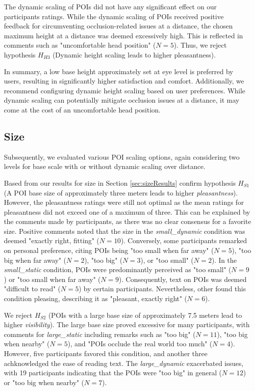 The dynamic scaling of POIs did not have any significant effect on our participants ratings. While the dynamic scaling of POIs received positive feedback for circumventing occlusion-related issues at a distance, the chosen maximum height at a distance was deemed excessively high. This is reflected in comments such as "uncomfortable head position" ($N=5$). Thus, we reject hypothesis $H_{H3}$ (Dynamic height scaling leads to higher pleasantness).

In summary, a low base height approximately set at eye level is preferred by users, resulting in significantly higher satisfaction and comfort. Additionally, we recommend configuring dynamic height scaling based on user preferences. While dynamic scaling can potentially mitigate occlusion issues at a distance, it may come at the cost of an uncomfortable head position.


\subsection{Size}
Subsequently, we evaluated various POI scaling options, again considering two levels for base scale with or without dynamic scaling over distance. 

Based from our results for size in Section \ref{sec:sizeResults} confirm hypothesis $H_{S1}$ (A POI base size of approximately three meters leads to higher \textit{pleasantness}). However, the pleasantness ratings were still not optimal as the mean ratings for pleasantness did not exceed one of a maximum of three. This can be explained by the comments made by participants, as there was no clear consensus for a favorite size. Positive comments noted that the size in the \textit{small\_dynamic} condition was deemed "exactly right, fitting" ($N=10$). Conversely, some participants remarked on personal preference, citing POIs being "too small when far away" ($N=5$), "too big when far away" ($N=2$), "too big" ($N=3$), or "too small" ($N=2$). In the \textit{small\_static} condition, POIs were predominantly perceived as "too small" ($N=9$) or "too small when far away" ($N=9$). Consequently, text on POIs was deemed "difficult to read" ($N=5$) by certain participants. Nevertheless, other found this condition pleasing, describing it as "pleasant, exactly right" ($N=6$).

We reject $H_{S2}$ (POIs with a large base size of approximately 7.5 meters lead to higher \textit{visibility}). The large base size proved excessive for many participants, with comments for \textit{large\_static} including remarks such as "too big" ($N=11$), "too big when nearby" ($N=5$), and "POIs occlude the real world too much" ($N=4$). However, five participants favored this condition, and another three achknowledged the ease of reading text.
The \textit{large\_dynamic} exacerbated issues, with 19 participants indicating that the POIs were "too big" in general ($N=12$) or "too big when nearby" ($N=7$).


